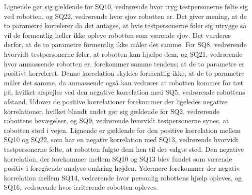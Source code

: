Lignende gør sig gældende for SQ10, vedrørende hvor tryg testpersonerne følte sig ved robotten, og SQ22, vedrørende hvor sjov robotten er. Det giver mening, at de to parametre korrelerer da det antages, at hvis testpersonerne føler sig utrygge så vil de formentlig heller ikke opleve robotten som værende sjov. Det vurderes derfor, at de to parametre formentlig ikke måler det samme. For SQ8, vedrørende hvorvidt testpersonerne føler, at robotten kan hjælpe dem, og SQ21, vedrørende hvor anmassende robotten er, forekommer samme tendens; at de to parametre er positivt korreleret. Denne korrelation skyldes formentlig ikke, at de to parametre måler det samme, da anmassende også kan vedrører at robotten kommer for tæt på, hvilket afspejles ved den negative korrelation med SQ5, vedrørende robottens afstand. \blankline
%
Udover de positive korrelationer forekommer der ligeledes negative korrelationer, hvilket blandt andet gør sig gældende for SQ2, vedrørende robottens bevægelser, og SQ9, vedrørende hvorvidt testpersonerne synes, at robotten stod i vejen. Lignende er gældende for den positive korrelation mellem SQ10 og SQ22, som har en negativ korrelation med SQ13, vedrørende hvorvidt testpersonerne følte, at robotten fulgte dem hen til det valgte sted. Den negative korrelation, der forekommer mellem SQ10 og SQ13 blev fundet som værende positiv i foregående analyse omkring højden. Ydermere forekommer der negativ korrelation mellem SQ14, vedrørende hvor personlig robottens hjælp opleves, og SQ16, vedrørende hvor irriterende robotten opleves. 

